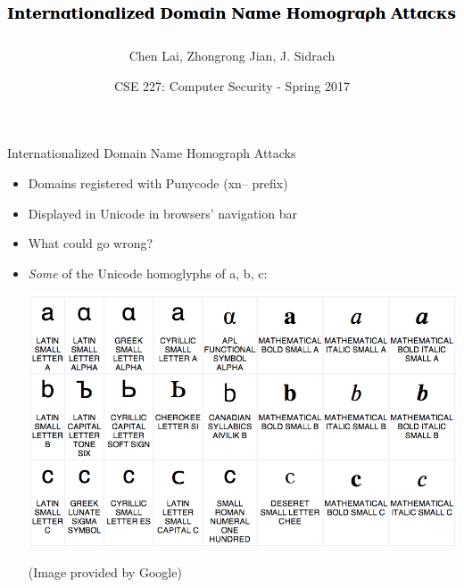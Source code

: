 \documentclass[usepdftitle=false]{beamer}
\title{\includegraphics[width=0.8\linewidth]{title}}
\author{Chen Lai, Zhongrong Jian, J. Sidrach}
\institute{University of California San Diego}
\date{CSE 227: Computer Security - Spring 2017}
\begin{document}
\begin{frame}
  \titlepage
\end{frame}


\begin{frame}{Internationalized Domain Name Homograph Attacks}
\begin{itemize}
  \item Domains registered with Punycode (xn-- prefix)
  \item Displayed in Unicode in browsers' navigation bar
  \item What could go wrong?
  \item \textit{Some} of the Unicode homoglyphs of a, b, c:

  \centering\includegraphics[width=0.8\linewidth]{images/homoglyphs}

  \small{(Image provided by Google)}
\end{itemize}

\end{frame}
\end{document}
